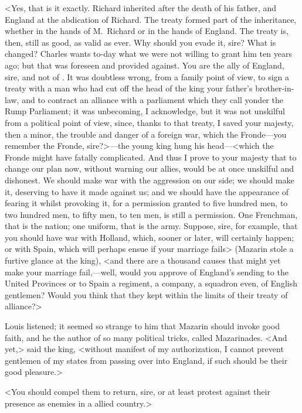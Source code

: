 <Yes, that is it exactly. Richard inherited after the death of his father, and England at the abdication of Richard. The treaty formed part of the inheritance, whether in the hands of M.~Richard or in the hands of England. The treaty is, then, still as good, as valid as ever. Why should you evade it, sire? What is changed? Charles wants to-day what we were not willing to grant him ten years ago; but that was foreseen and provided against. You are the ally of England, sire, and not of . It was doubtless wrong, from a family point of view, to sign a treaty with a man who had cut off the head of the king your father's brother-in-law, and to contract an alliance with a parliament which they call yonder the Rump Parliament; it was unbecoming, I acknowledge, but it was not unskilful from a political point of view, since, thanks to that treaty, I saved your majesty, then a minor, the trouble and danger of a foreign war, which the Fronde—you remember the Fronde, sire?>—the young king hung his head—<which the Fronde might have fatally complicated. And thus I prove to your majesty that to change our plan now, without warning our allies, would be at once unskilful and dishonest. We should make war with the aggression on our side; we should make it, deserving to have it made against us; and we should have the appearance of fearing it whilst provoking it, for a permission granted to five hundred men, to two hundred men, to fifty men, to ten men, is still a permission. One Frenchman, that is the nation; one uniform, that is the army. Suppose, sire, for example, that you should have war with Holland, which, sooner or later, will certainly happen; or with Spain, which will perhaps ensue if your marriage fails> (Mazarin stole a furtive glance at the king), <and there are a thousand causes that might yet make your marriage fail,—well, would you approve of England's sending to the United Provinces or to Spain a regiment, a company, a squadron even, of English gentlemen? Would you think that they kept within the limits of their treaty of alliance?>

Louis listened; it seemed so strange to him that Mazarin should invoke good faith, and he the author of so many political tricks, called Mazarinades. <And yet,> said the king, <without manifest of my authorization, I cannot prevent gentlemen of my states from passing over into England, if such should be their good pleasure.>

<You should compel them to return, sire, or at least protest against their presence as enemies in a allied country.>

